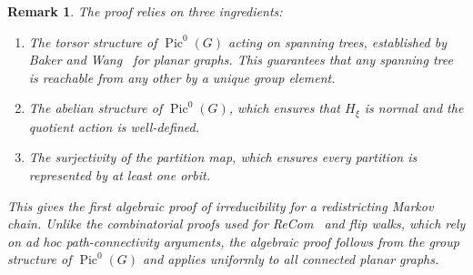 \documentclass[11pt]{article}
\newtheorem{remark}{Remark}[section]
\newcommand{\Pic}{\operatorname{Pic}^0}
\begin{document}
\begin{remark}
The proof relies on three ingredients:
\begin{enumerate}
  \item The \emph{torsor structure} of $\Pic(G)$ acting on spanning trees,
    established by Baker and Wang~\cite{baker2018bernardi} for planar graphs.
    This guarantees that any spanning tree is reachable from any other by a
    unique group element.
  \item The \emph{abelian} structure of $\Pic(G)$, which ensures that
    $H_\xi$ is normal and the quotient action is well-defined.
  \item The \emph{surjectivity} of the partition map, which ensures every
    partition is represented by at least one orbit.
\end{enumerate}
This gives the first algebraic proof of irreducibility for a redistricting
Markov chain. Unlike the combinatorial proofs used for ReCom~\cite{deford2021recombination} and
flip walks, which rely on ad hoc path-connectivity arguments, the algebraic
proof follows from the group structure of $\Pic(G)$ and applies uniformly to
all connected planar graphs.
\end{remark}





\end{document}
